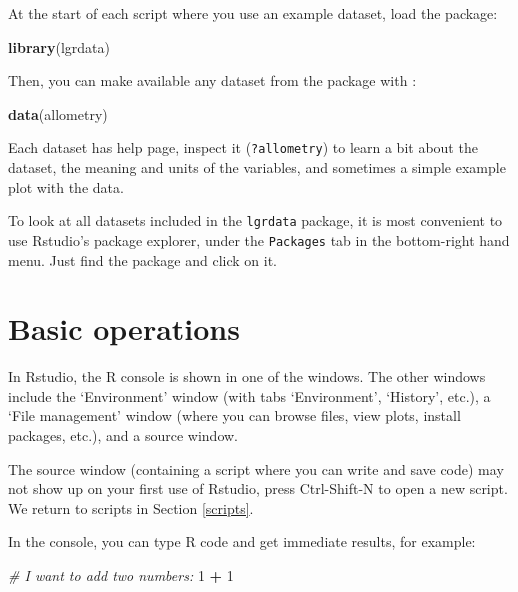 \documentclass[]{book}
\newenvironment{Shaded}{\begin{snugshade}}{\end{snugshade}}
\newcommand{\CommentTok}[1]{\textcolor[rgb]{0.56,0.35,0.01}{\textit{#1}}}
\newcommand{\DecValTok}[1]{\textcolor[rgb]{0.00,0.00,0.81}{#1}}
\newcommand{\KeywordTok}[1]{\textcolor[rgb]{0.13,0.29,0.53}{\textbf{#1}}}
\newcommand{\NormalTok}[1]{#1}
\newcommand{\OperatorTok}[1]{\textcolor[rgb]{0.81,0.36,0.00}{\textbf{#1}}}
\newcommand{\StringTok}[1]{\textcolor[rgb]{0.31,0.60,0.02}{#1}}
\let\BeginKnitrBlock\begin \let\EndKnitrBlock\end
\begin{document}
At the start of each script where you use an example dataset, load the package:

\begin{Shaded}
\begin{Highlighting}[]
\KeywordTok{library}\NormalTok{(lgrdata)}
\end{Highlighting}
\end{Shaded}

Then, you can make available any dataset from the package with :

\begin{Shaded}
\begin{Highlighting}[]
\KeywordTok{data}\NormalTok{(allometry)}
\end{Highlighting}
\end{Shaded}

Each dataset has help page, inspect it (\texttt{?allometry}) to learn a bit about the dataset, the meaning and units of the variables, and sometimes a simple example plot with the data.

\BeginKnitrBlock{rmdtry}
To look at all datasets included in the \texttt{lgrdata} package, it is most convenient to use Rstudio's package explorer, under the \texttt{Packages} tab in the bottom-right hand menu. Just find the package and click on it.
\EndKnitrBlock{rmdtry}

\hypertarget{basicops}{%
\section{Basic operations}\label{basicops}}

In Rstudio, the R console is shown in one of the windows. The other windows include the `Environment' window (with tabs `Environment', `History', etc.), a `File management' window (where you can browse files, view plots, install packages, etc.), and a source window.

The source window (containing a script where you can write and save code) may not show up on your first use of Rstudio, press Ctrl-Shift-N to open a new script. We return to scripts in Section \ref{scripts}.

In the console, you can type R code and get immediate results, for example:

\begin{Shaded}
\begin{Highlighting}[]
\CommentTok{# I want to add two numbers:}
\DecValTok{1} \OperatorTok{+}\StringTok{ }\DecValTok{1}
\end{Highlighting}
\end{Shaded}
\end{document}
